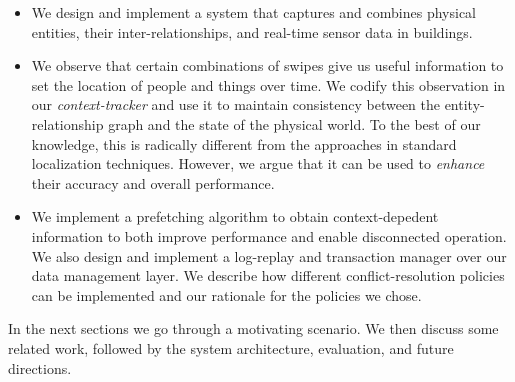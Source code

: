 \begin{itemize}
\item We design and implement a system that captures and combines physical entities, their inter-relationships, and real-time sensor data 
		in buildings.%
\item We observe that certain combinations of swipes give us useful information to set the location of people and things over time.
		We codify this observation in our \emph{context-tracker} and use it to maintain consistency between the entity-relationship graph and the 
		state of the physical world.  To the best of our knowledge, this is radically different from the approaches in standard 
		localization techniques.  However, we argue that it can be used to \emph{enhance} their accuracy and overall performance.
\item We implement a prefetching algorithm to obtain context-depedent information to both improve performance and
		enable disconnected operation.  We also design and implement a log-replay and transaction manager over our data management layer.  We describe how different conflict-resolution policies can be implemented and our rationale for the policies we chose.
\end{itemize}

\vspace{0.08in}

In the next sections we go through a motivating scenario.  We then discuss some related work, followed 
by the system architecture, evaluation, and future directions.



